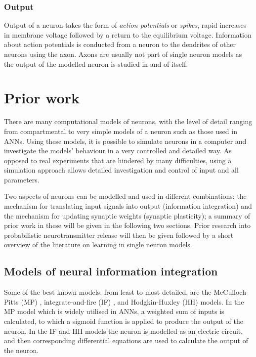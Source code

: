\documentclass[a4paper,12pt]{report}
\theoremstyle{definition}
\begin{document}
\subsubsection{Output}

Output of a neuron takes the form of \emph{action potentials} or \emph{spikes}, rapid increases in membrane voltage followed by a return to the equilibrium voltage. Information about action potentials is conducted from a neuron to the dendrites of other neurons using the axon. Axons are usually not part of single neuron models as the output of the modelled neuron is studied in and of itself.

\section{Prior work}


There are many computational models of neurons, with the level of detail ranging from compartmental to very simple models of a neuron such as those used in ANNs. Using these models, it is possible to simulate neurons in a computer and investigate the models' behaviour in a very controlled and detailed way. As opposed to real experiments that are hindered by many difficulties, using a simulation approach allows detailed investigation and control of input and all parameters.

Two aspects of neurons can be modelled and used in different combinations: the mechanism for translating input signals into output (information integration) and the mechanism for updating synaptic weights (synaptic plasticity); a summary of prior work in these will be given in the following two sections. Prior research into probabilistic neurotransmitter release will then be given followed by a short overview of the literature on learning in single neuron models.


\subsection{Models of neural information integration}
\label{subsec:modelsofintegration}

Some of the best known models, from least to most detailed, are the McCulloch-Pitts (MP) \cite{mcculloch1943logical}, integrate-and-fire (IF) \cite{lapicque1907recherches}, and Hodgkin-Huxley (HH) \cite{hodgkin1952quantitative} models. In the MP model which is widely utilised in ANNs, a weighted sum of inputs is calculated, to which a sigmoid function is applied to produce the output of the neuron. In the IF and HH models the neuron is modelled as an electric circuit, and then corresponding differential equations are used to calculate the output of the neuron.
\end{document}
